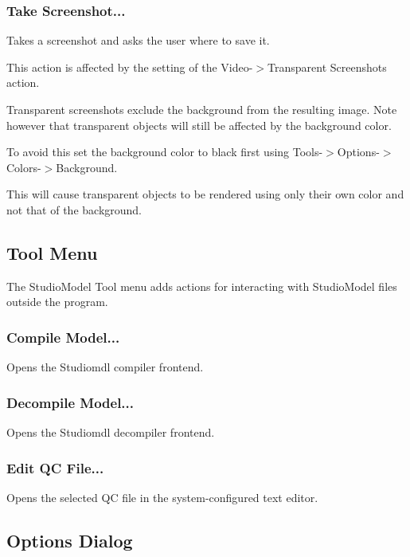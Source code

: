 \documentclass[10pt, a4paper, titlepage, oneside]{article}
\begin{document}
\subsubsection{Take Screenshot...}

Takes a screenshot and asks the user where to save it.

This action is affected by the setting of the Video-$>$Transparent Screenshots action.

Transparent screenshots exclude the background from the resulting image. Note however that transparent objects will still be affected by the background color.

\begin{sloppy}
To avoid this set the background color to black first using \mbox{Tools-$>$Options-$>$Colors-$>$Background}.
\end{sloppy}

This will cause transparent objects to be rendered using only their own color and not that of the background.

\subsection{Tool Menu}

The StudioModel Tool menu adds actions for interacting with StudioModel files outside the program.

\subsubsection{Compile Model...}

Opens the Studiomdl compiler frontend.

\subsubsection{Decompile Model...}

Opens the Studiomdl decompiler frontend.

\subsubsection{Edit QC File...}

Opens the selected QC file in the system-configured text editor.

\newpage

\subsection{Options Dialog}
\end{document}
